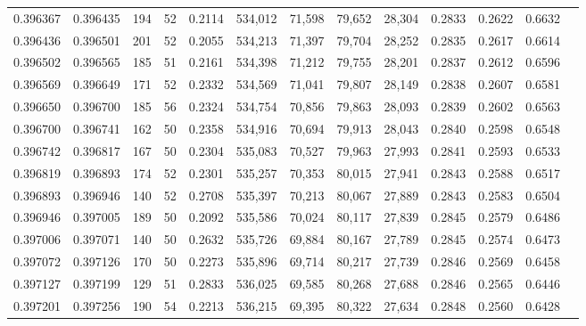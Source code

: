 \begin{tabular}{rrrrrrrrrrrrr}
0.396367 & 0.396435 &   194 &  52 &                                     0.2114 & 534,012 &  71,598 &  79,652 &  28,304 & 0.2833 & 0.2622 & 0.6632 \\
0.396436 & 0.396501 &   201 &  52 &                                     0.2055 & 534,213 &  71,397 &  79,704 &  28,252 & 0.2835 & 0.2617 & 0.6614 \\
0.396502 & 0.396565 &   185 &  51 &                                     0.2161 & 534,398 &  71,212 &  79,755 &  28,201 & 0.2837 & 0.2612 & 0.6596 \\
0.396569 & 0.396649 &   171 &  52 &                                     0.2332 & 534,569 &  71,041 &  79,807 &  28,149 & 0.2838 & 0.2607 & 0.6581 \\
0.396650 & 0.396700 &   185 &  56 &                                     0.2324 & 534,754 &  70,856 &  79,863 &  28,093 & 0.2839 & 0.2602 & 0.6563 \\
0.396700 & 0.396741 &   162 &  50 &                                     0.2358 & 534,916 &  70,694 &  79,913 &  28,043 & 0.2840 & 0.2598 & 0.6548 \\
0.396742 & 0.396817 &   167 &  50 &                                     0.2304 & 535,083 &  70,527 &  79,963 &  27,993 & 0.2841 & 0.2593 & 0.6533 \\
0.396819 & 0.396893 &   174 &  52 &                                     0.2301 & 535,257 &  70,353 &  80,015 &  27,941 & 0.2843 & 0.2588 & 0.6517 \\
0.396893 & 0.396946 &   140 &  52 &                                     0.2708 & 535,397 &  70,213 &  80,067 &  27,889 & 0.2843 & 0.2583 & 0.6504 \\
0.396946 & 0.397005 &   189 &  50 &                                     0.2092 & 535,586 &  70,024 &  80,117 &  27,839 & 0.2845 & 0.2579 & 0.6486 \\
0.397006 & 0.397071 &   140 &  50 &                                     0.2632 & 535,726 &  69,884 &  80,167 &  27,789 & 0.2845 & 0.2574 & 0.6473 \\
0.397072 & 0.397126 &   170 &  50 &                                     0.2273 & 535,896 &  69,714 &  80,217 &  27,739 & 0.2846 & 0.2569 & 0.6458 \\
0.397127 & 0.397199 &   129 &  51 &                                     0.2833 & 536,025 &  69,585 &  80,268 &  27,688 & 0.2846 & 0.2565 & 0.6446 \\
0.397201 & 0.397256 &   190 &  54 &                                     0.2213 & 536,215 &  69,395 &  80,322 &  27,634 & 0.2848 & 0.2560 & 0.6428 \\

\end{tabular}
